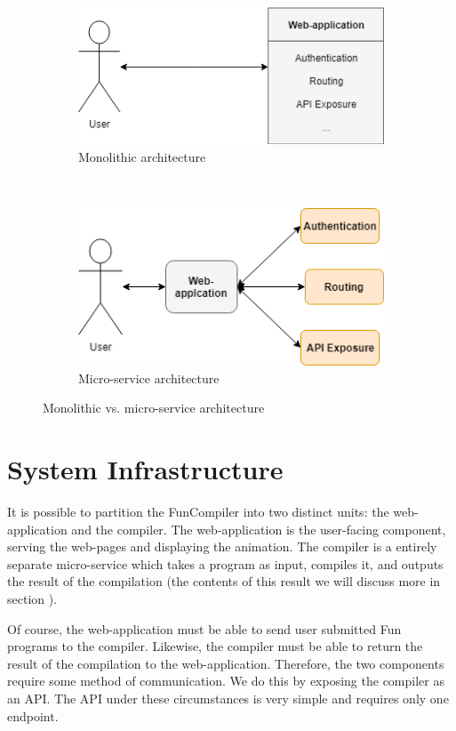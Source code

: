\documentclass{l4proj}
\begin{document}
\begin{figure}[h]
	\centering
	\begin{subfigure}[b]{0.3\textwidth}
		\includegraphics[scale=0.35]{images/mono.png}
		\caption{Monolithic architecture}
		\label{fig:mono}
	\end{subfigure}
	~
	\begin{subfigure}[b]{0.3\textwidth}
		\includegraphics[scale=0.35]{images/micro.png}
		\caption{Micro-service architecture}
		\label{fig:micro}
	\end{subfigure}
	\caption{Monolithic vs. micro-service architecture}\label{fig:mono-micro}	
\end{figure}
\section{System Infrastructure}
It is possible to partition the FunCompiler into two distinct units: the web-application and the compiler. The web-application is the user-facing component, serving the web-pages and displaying the animation. The compiler is a entirely separate micro-service which takes a program as input, compiles it, and outputs the result of the compilation (the contents of this result we will discuss more in section ). 

Of course, the web-application must be able to send user submitted Fun programs to the compiler. Likewise, the compiler must be able to return the result of the compilation to the web-application. Therefore, the two components require some method of communication. We do this by exposing the compiler as an API. The API under these circumstances is very simple and requires only one endpoint. 
\end{document}
